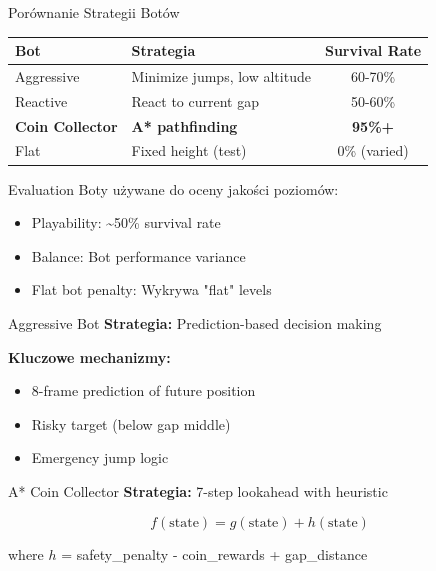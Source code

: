 \documentclass{beamer}
\begin{document}
\begin{frame}{Porównanie Strategii Botów}
\begin{table}
\centering
\begin{tabular}{llc}
\toprule
\textbf{Bot} & \textbf{Strategia} & \textbf{Survival Rate} \\
\midrule
Aggressive & Minimize jumps, low altitude & 60-70\% \\
Reactive & React to current gap & 50-60\% \\
\textbf{Coin Collector} & \textbf{A* pathfinding} & \textbf{95\%+} \\
Flat & Fixed height (test) & 0\% (varied) \\
\bottomrule
\end{tabular}
\end{table}

\vspace{0.5cm}
\begin{block}{Evaluation}
Boty używane do oceny jakości poziomów:
\begin{itemize}
\item Playability: \textasciitilde50\% survival rate
\item Balance: Bot performance variance
\item Flat bot penalty: Wykrywa "flat" levels
\end{itemize}
\end{block}
\end{frame}

\begin{frame}[fragile]{Aggressive Bot}
\textbf{Strategia:} Prediction-based decision making



\vspace{0.3cm}
\textbf{Kluczowe mechanizmy:}
\begin{itemize}
\item 8-frame prediction of future position
\item Risky target (below gap middle)
\item Emergency jump logic
\end{itemize}
\end{frame}

\begin{frame}[fragile]{A* Coin Collector}
\textbf{Strategia:} 7-step lookahead with heuristic



\vspace{0.3cm}
\begin{equation*}
f(\text{state}) = g(\text{state}) + h(\text{state})
\end{equation*}

where $h$ = safety\_penalty - coin\_rewards + gap\_distance
\end{frame}
\end{document}
